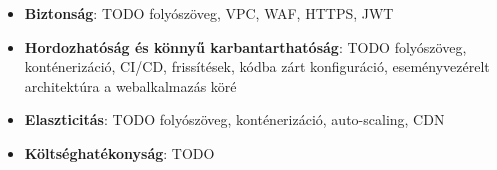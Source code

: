 \begin{itemize}
  \item \textbf{Biztonság}: TODO folyószöveg, VPC, WAF, HTTPS, JWT
  \item \textbf{Hordozhatóság és könnyű karbantarthatóság}: TODO folyószöveg, konténerizáció, CI/CD, frissítések, kódba zárt konfiguráció, eseményvezérelt architektúra a webalkalmazás köré
  \item \textbf{Elaszticitás}: TODO folyószöveg, konténerizáció, auto-scaling, CDN
  \item \textbf{Költséghatékonyság}: TODO
\end{itemize}
